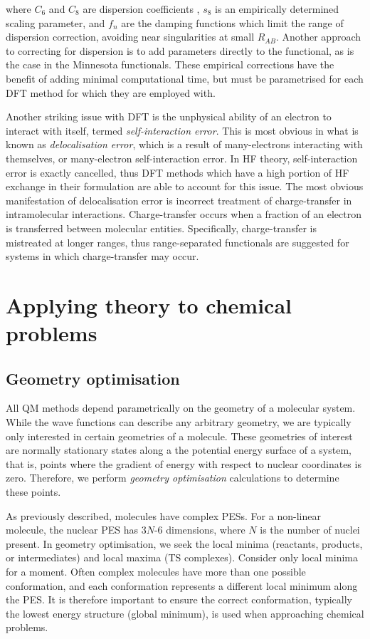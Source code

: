 \noindent where $C_6$ and $C_8$ are dispersion coefficients , $s_8$ is an
empirically determined scaling parameter, and $f_n$ are the damping functions
which limit the range of dispersion correction, avoiding near singularities at
small $R_{AB}$. Another approach to correcting for dispersion is to add
parameters directly to the functional, as is the case in the Minnesota
functionals.\cite{Zhao2006,Zhao2006} These empirical corrections have the
benefit of adding minimal computational time, but must be parametrised for each
DFT method for which they are employed with.

Another striking issue with DFT is the unphysical ability of an electron to
interact with itself, termed \emph{self-interaction error}. This is most obvious
in what is known as \emph{delocalisation error}, which is a result of
many-electrons interacting with themselves, or many-electron self-interaction
error. In HF theory, self-interaction error is exactly cancelled, thus DFT
methods which have a high portion of HF exchange in their formulation are able
to account for this issue. The most obvious manifestation of delocalisation
error is incorrect treatment of charge-transfer in intramolecular
interactions.\cite{MoriSanchez2008,OterodelaRoza2014} Charge-transfer occurs
when a fraction of an electron is transferred between molecular
entities. Specifically, charge-transfer is mistreated at longer ranges, thus
range-separated functionals are suggested for systems in which charge-transfer
may occur.

\section{Applying theory to chemical problems}

\subsection{Geometry optimisation}

All QM methods depend parametrically on the geometry of a molecular
system. While the wave functions can describe any arbitrary geometry, we are
typically only interested in certain geometries of a molecule. These geometries
of interest are normally stationary states along a the potential energy surface
of a system, that is, points where the gradient of energy with respect to
nuclear coordinates is zero. Therefore, we perform \emph{geometry optimisation}
calculations to determine these points.

As previously described, molecules have complex PESs. For a non-linear molecule,
the nuclear PES has 3$N$-6 dimensions, where $N$ is the number of nuclei
present.\cite{Heidrich1991} In geometry optimisation, we seek the local minima
(reactants, products, or intermediates) and local maxima (TS
complexes). Consider only local minima for a moment. Often complex molecules
have more than one possible conformation, and each conformation represents a
different local minimum along the PES. It is therefore important to ensure the
correct conformation, typically the lowest energy structure (global minimum), is
used when approaching chemical problems.

